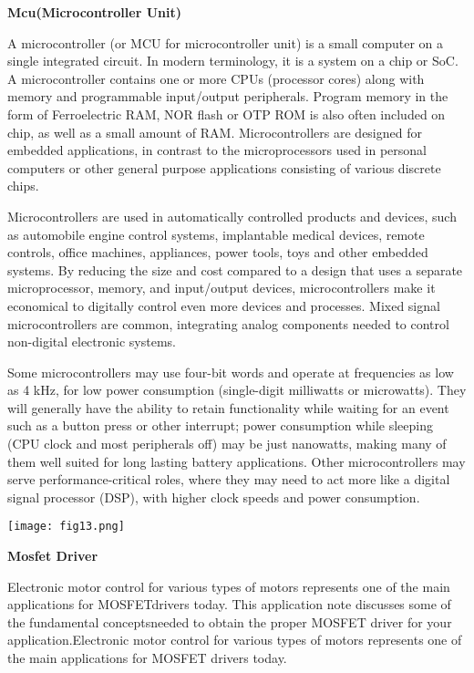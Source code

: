 \documentclass[11pt]{article}
\begin{document}
\textbf{ Mcu(Microcontroller Unit)}\newline

A microcontroller (or MCU for microcontroller unit) is a small computer on a single integrated circuit. In modern terminology, it is a system on a chip or SoC. A microcontroller contains one or more CPUs (processor cores) along with memory and programmable input/output peripherals. Program memory in the form of Ferroelectric RAM, NOR flash or OTP ROM is also often included on chip, as well as a small amount of RAM. Microcontrollers are designed for embedded applications, in contrast to the microprocessors used in personal computers or other general purpose applications consisting of various discrete chips.

Microcontrollers are used in automatically controlled products and devices, such as automobile engine control systems, implantable medical devices, remote controls, office machines, appliances, power tools, toys and other embedded systems. By reducing the size and cost compared to a design that uses a separate microprocessor, memory, and input/output devices, microcontrollers make it economical to digitally control even more devices and processes. Mixed signal microcontrollers are common, integrating analog components needed to control non-digital electronic systems.

Some microcontrollers may use four-bit words and operate at frequencies as low as 4 kHz, for low power consumption (single-digit milliwatts or microwatts). They will generally have the ability to retain functionality while waiting for an event such as a button press or other interrupt; power consumption while sleeping (CPU clock and most peripherals off) may be just nanowatts, making many of them well suited for long lasting battery applications. Other microcontrollers may serve performance-critical roles, where they may need to act more like a digital signal processor (DSP), with higher clock speeds and power consumption.

\begin {center}
\texttt{[image: fig13.png]}\newline
\end{center}

\textbf{Mosfet Driver}\newline

Electronic motor control for various types of motors represents one of the main applications for MOSFETdrivers today. This application note discusses some of the fundamental conceptsneeded to obtain the proper MOSFET driver for your application.Electronic motor control for various types of motors represents one of the main applications for MOSFET drivers today.\newline
\end{document}
